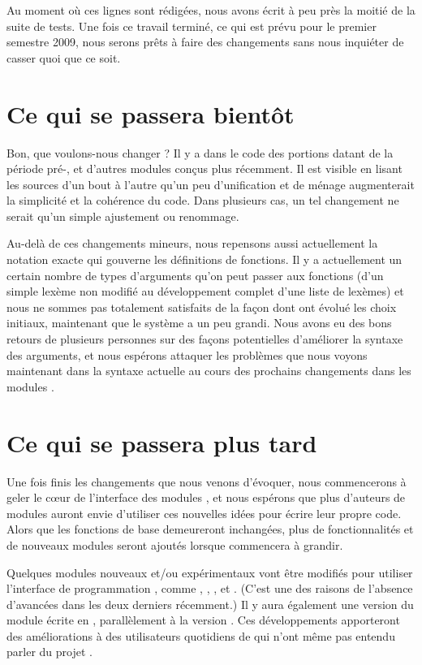 Au moment où ces lignes sont rédigées, nous avons écrit à peu près la moitié
de la suite de tests. Une fois ce travail terminé, ce qui est prévu pour le
premier semestre 2009, nous serons prêts à faire des changements sans nous
inquiéter de casser quoi que ce soit.

\newcolumn

\section{Ce qui se passera bientôt}

Bon, que voulons-nous changer ? Il y a dans le code  des portions
datant de la période pré-\latexe, et d'autres modules conçus plus récemment.
Il est visible en lisant les sources d'un bout à l'autre qu'un peu
d'unification et de ménage augmenterait la simplicité et la cohérence du code.
Dans plusieurs cas, un tel changement ne serait qu'un simple ajustement ou
renommage.

Au-delà de ces changements mineurs, nous repensons aussi actuellement la
notation exacte qui gouverne les définitions de fonctions. Il y a actuellement
un certain nombre de types d'arguments qu'on peut passer aux fonctions (d'un
simple lexème non modifié au développement complet d'une liste de lexèmes) et
nous ne sommes pas totalement satisfaits de la façon dont ont évolué les
choix initiaux, maintenant que le système a un peu grandi. Nous avons eu des
bons retours de plusieurs personnes sur des façons potentielles d'améliorer la
syntaxe des arguments, et nous espérons attaquer les problèmes que nous voyons
maintenant dans la syntaxe actuelle au cours des prochains changements dans
les modules .

\section{Ce qui se passera plus tard}

Une fois finis les changements que nous venons d'évoquer, nous commencerons à
geler le cœur de l'interface des modules , et nous espérons que plus
d'auteurs de modules auront envie d'utiliser ces nouvelles idées pour écrire
leur propre code. Alors que les fonctions de base demeureront inchangées, plus
de fonctionnalités et de nouveaux modules seront ajoutés lorsque \latexx
commencera à grandir.

Quelques modules nouveaux et/ou expérimentaux vont être modifiés pour utiliser
l'interface de programmation , comme , ,
,  et . (C'est une des raisons de
l'absence d'avancées dans les deux derniers récemment.) Il y aura également
une version du module  écrite en , parallèlement à la
version \latexe. Ces développements apporteront des améliorations à des
utilisateurs quotidiens de \latex qui n'ont même pas entendu parler du projet
\latexx.

